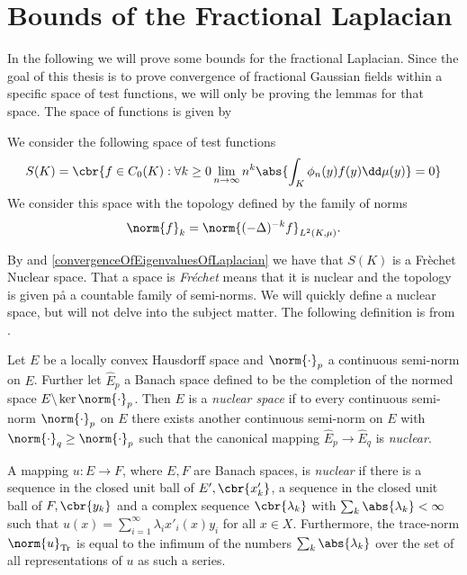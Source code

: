 \section{Bounds of the Fractional Laplacian}
In the following we will prove some bounds for the fractional Laplacian. Since the goal of this thesis is to prove convergence of fractional Gaussian fields within a specific space of test functions, we will only be proving the lemmas for that space. The space of functions is given by

\begin{defi}
	We consider the following space of test functions
	\begin{equation}
		S(K) = \cbr{f \in C_0(K) : \forall k \geq 0 \lim_{n \to \infty} n ^{k} \abs{\int_{K} \phi_n(y)f(y) \dd \mu (y)} = 0}
	\end{equation}
	We consider this space with the topology defined by the family of norms
	\begin{equation}
		\norm{f}_k = \norm{(-\Delta)^{-k}f}_{L^2(K, \mu)}.
	\end{equation}
\end{defi}
By \cite[Theorem 2]{germanOne} and \cref{convergenceOfEigenvaluesOfLaplacian} we have that $S(K)$ is a Frèchet Nuclear space. That a space is \emph{Fréchet} means that it is nuclear and the topology is given på a countable family of semi-norms. We will quickly define a nuclear space, but will not delve into the subject matter. The following definition is from \cite[Chapter 50]{Treves}.
\begin{defi} \label{NuclearSpace}
	Let $E$ be a locally convex Hausdorff space and $\norm{\cdot}_p$ a continuous semi-norm on $E$. Further let $\hat{E}_{p}$ a Banach space defined to be the completion of the normed space $E \backslash \ker \norm{\cdot}_p$. Then $E$ is a \emph{nuclear space} if to every continuous semi-norm $\norm{\cdot}_p$ on $E$ there exists  another continuous semi-norm on $E$ with $\norm{\cdot}_q \geq \norm{\cdot}_p$ such that the canonical mapping $\hat{E}_{p} \to \hat{E}_q$ is \emph{nuclear}. 
	
	A mapping $u: E \to F$, where $E,F$ are Banach spaces, is \emph{nuclear} if there is a sequence in the closed unit ball of $E', \cbr{x'_k}$, a sequence in the closed unit ball of $F, \cbr{y_k}$ and a complex sequence $\cbr{\lambda_k}$ with $\sum_{k}\abs{\lambda_k} < \infty$ such that $u(x) = \sum_{i = 1}^{\infty} \lambda_i x'_i(x)y_i$ for all $x \in X$. Furthermore, the trace-norm $\norm{u}_{\text{Tr}}$ is equal to the infimum of the numbers $\sum_{k} \abs{\lambda_k}$ over the set of all representations of $u$ as such a series.
\end{defi}
